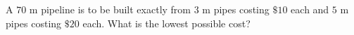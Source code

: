 A $70$ m pipeline is to be built exactly from $3$ m pipes costing $\$10$ each and $5$ m pipes costing $\$20$ each. What is the lowest possible cost?
